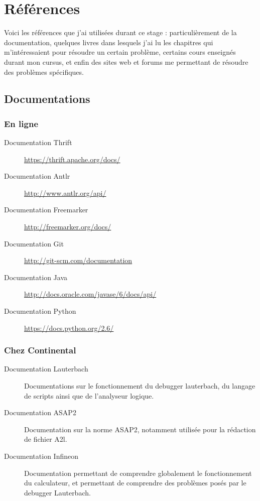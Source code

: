 \chapter{Références}\label{references}	
Voici les références que j'ai utilisées durant ce stage : particulièrement de la documentation, quelques livres dans lesquels j'ai lu les chapitres qui m'intéressaient pour résoudre un certain problème, certains cours enseignés durant mon cursus, et enfin des sites web et forums me permettant de résoudre des problèmes spécifiques.

\section{Documentations}
\subsection{En ligne}
\begin{description}
	\item[Documentation Thrift] \url{https://thrift.apache.org/docs/}
	\item[Documentation Antlr] \url{http://www.antlr.org/api/}
	\item[Documentation Freemarker] \url{http://freemarker.org/docs/}
	\item[Documentation Git] \url{http://git-scm.com/documentation}	
	\item[Documentation Java] \url{http://docs.oracle.com/javase/6/docs/api/}
	\item[Documentation Python] \url{https://docs.python.org/2.6/}
\end{description}

\subsection{Chez Continental}
\begin{description}
	\item[Documentation Lauterbach] Documentations sur le fonctionnement du debugger lauterbach, du langage de scripts ainsi que de l'analyseur logique.
	\item[Documentation ASAP2] Documentation sur la norme ASAP2, notamment utilisée pour la rédaction de fichier A2l.
	\item[Documentation Infineon] Documentation permettant de comprendre globalement le fonctionnement du calculateur, et permettant de comprendre des problèmes posés par le debugger Lauterbach.
\end{description}

